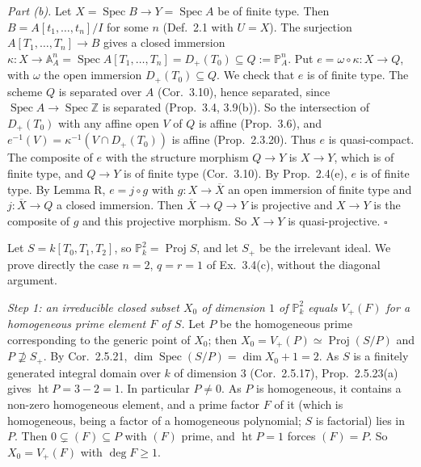 \documentclass[11pt]{article}
\begin{document}
\emph{Part (b).} Let $X=\operatorname{Spec}B\to Y=\operatorname{Spec}A$ be of finite type. Then $B=A[t_1,\dots,t_n]/I$ for some $n$ (Def.~2.1 with $U=X$). The surjection $A[T_1,\dots,T_n]\to B$ gives a closed immersion $\kappa:X\to\mathbb{A}^n_A=\operatorname{Spec}A[T_1,\dots,T_n]=D_+(T_0)\subseteq Q:=\mathbb{P}^n_A$. Put $e=\omega\circ\kappa:X\to Q$, with $\omega$ the open immersion $D_+(T_0)\subseteq Q$. We check that $e$ is of finite type. The scheme $Q$ is separated over $A$ (Cor.~3.10), hence separated, since $\operatorname{Spec}A\to\operatorname{Spec}\mathbb{Z}$ is separated (Prop.~3.4, 3.9(b)). So the intersection of $D_+(T_0)$ with any affine open $V$ of $Q$ is affine (Prop.~3.6), and $e^{-1}(V)=\kappa^{-1}(V\cap D_+(T_0))$ is affine (Prop.~2.3.20). Thus $e$ is quasi-compact. The composite of $e$ with the structure morphism $Q\to Y$ is $X\to Y$, which is of finite type, and $Q\to Y$ is of finite type (Cor.~3.10). By Prop.~2.4(e), $e$ is of finite type. By Lemma R, $e=j\circ g$ with $g:X\to\overline X$ an open immersion of finite type and $j:\overline X\to Q$ a closed immersion. Then $\overline X\to Q\to Y$ is projective and $X\to Y$ is the composite of $g$ and this projective morphism. So $X\to Y$ is quasi-projective. \hfill$\square$

\pf
Let $S=k[T_0,T_1,T_2]$, so $\mathbb{P}^2_k=\operatorname{Proj}S$, and let $S_+$ be the irrelevant ideal. We prove directly the case $n=2$, $q=r=1$ of Ex.~3.4(c), without the diagonal argument.

\emph{Step 1: an irreducible closed subset $X_0$ of dimension $1$ of $\mathbb{P}^2_k$ equals $V_+(F)$ for a homogeneous prime element $F$ of $S$.} Let $P$ be the homogeneous prime corresponding to the generic point of $X_0$; then $X_0=V_+(P)\simeq\operatorname{Proj}(S/P)$ and $P\not\supseteq S_+$. By Cor.~2.5.21, $\dim\operatorname{Spec}(S/P)=\dim X_0+1=2$. As $S$ is a finitely generated integral domain over $k$ of dimension $3$ (Cor.~2.5.17), Prop.~2.5.23(a) gives $\operatorname{ht}P=3-2=1$. In particular $P\neq0$. As $P$ is homogeneous, it contains a non-zero homogeneous element, and a prime factor $F$ of it (which is homogeneous, being a factor of a homogeneous polynomial; $S$ is factorial) lies in $P$. Then $0\subsetneq(F)\subseteq P$ with $(F)$ prime, and $\operatorname{ht}P=1$ forces $(F)=P$. So $X_0=V_+(F)$ with $\deg F\ge1$.
\end{document}
